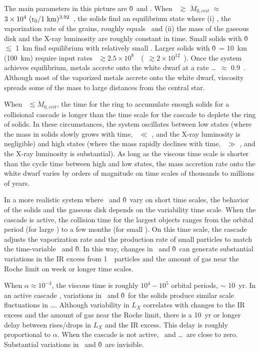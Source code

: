 \documentclass[12pt,preprint]{aastex}
\begin{document}
The main parameters in this picture are \r0\ and \mdotz. When \mdotz\ $\gtrsim$ 
$\dot{M}_{0, crit}$ $\approx$ $3 \times 10^4 ~ ({\rm r_0 / 1~km})^{3.92}$~\gs,
the solids find an equilibrium state where 
(i) \mdotv, the vaporization rate of the grains, roughly equals \mdotz\ and 
(ii) the mass of the gaseous disk and the X-ray luminosity are roughly constant in time. 
Small solids with \r0\ $\lesssim$ 1~km find equilibrium with relatively small \mdotz. 
Larger solids with \r0\ = 10~km (100~km) require input rates 
\mdotz\ $\gtrsim 2.5 \times 10^8$~\gs\ (\mdotz\ $\gtrsim 2 \times 10^{12}$~\gs).
Once the system achieves equilibrium, metals accrete onto the white dwarf at a rate 
\mdots\ $\approx$ 0.9~\mdotz. Although most of the vaporized metals accrete onto the 
white dwarf, viscosity spreads some of the mass to large distances from the central star.

When \mdotz\ $\lesssim \dot{M}_{0, crit} $, the time for the ring to accumulate enough 
solids for a collisional cascade is longer than the time scale for the cascade to deplete 
the ring of solids. In these circumstances, the system oscillates between low states 
(where the mass in solids slowly grows with time, \mdotv\ $\ll$ \mdotz, and the X-ray 
luminosity is negligible) and high states (where the mass rapidly declines with time, 
\mdotv\ $\gg$ \mdotz, and the X-ray luminosity is substantial).  As long as the viscous 
time scale is shorter than the cycle time between high and low states, the mass accretion 
rate onto the white dwarf varies by orders of magnitude on time scales of thousands to 
millions of years.

In a more realistic system where \mdotz\ and \r0\ vary on short time scales, the behavior 
of the solids and the gaseous disk depends on the variability time scale. When the cascade 
is active, the collision time for the largest objects ranges from the orbital period (for
large \mdotz) to a few months (for small \mdotz).  On this time scale, the cascade adjusts 
the vaporization rate and the production rate of small particles to match the time-variable 
\mdotz\ and \r0. In this way, changes in \mdotz\ and \r0\ can generate substantial variations 
in the IR excess from 1~\mum\ particles and the amount of gas near the Roche limit on week 
or longer time scales.

When $\alpha \approx 10^{-3}$, the viscous time is roughly $10^4 - 10^5$ orbital periods,
$\sim$ 10~yr. In an active cascade , variations in \mdotz\ and \r0\ for the solids produce 
similar scale fluctuations in \mdots. Although variability in $L_X$ correlates with changes 
to the IR excess and the amount of gas near the Roche limit, there is a 10~yr or longer delay 
between rises/drops in $L_X$ and the IR excess. This delay is roughly proportional to $\alpha$.
When the cascade is not active, \mdotv\ and \mdots\ are close to zero. Substantial 
variations in \mdotz\ and \r0\ are invisible. 
\end{document}
